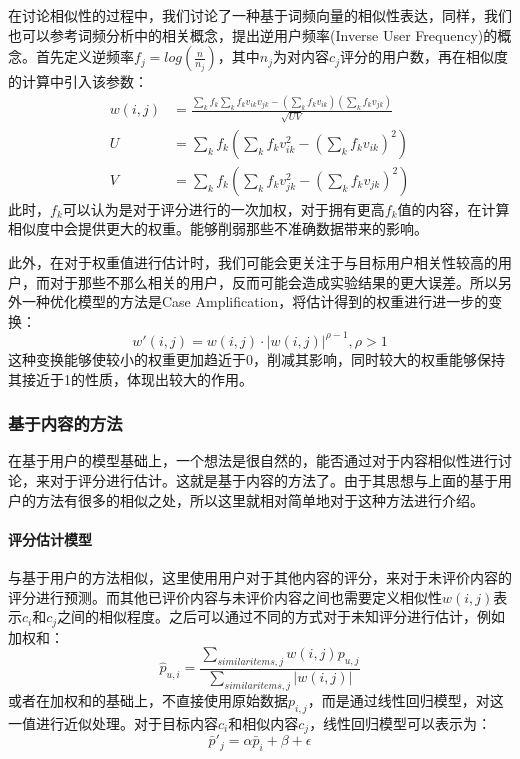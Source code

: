 在讨论相似性的过程中，我们讨论了一种基于词频向量的相似性表达，同样，我们也可以参考词频分析中的相关概念，提出逆用户频率(Inverse User Frequency)的概念\cite{FreqVector}。首先定义逆频率$f_j = log(\frac{n}{n_j})$，其中$n_j$为对内容$c_j$评分的用户数，再在相似度的计算中引入该参数：
\begin{align}
    w(i, j) &= \frac{\sum_{k}f_k\sum_{k}f_k v_{ik}v_{jk} - (\sum_{k}f_k v_{ik})(\sum_{k}f_k v_{jk})}{\sqrt{UV}}\\
    U &= \sum_{k}f_k (\sum_{k}f_k v_{ik}^2 - (\sum_{k}f_k v_{ik})^2)\\
    V &= \sum_{k}f_k (\sum_{k}f_k v_{jk}^2 - (\sum_{k}f_k v_{jk})^2)
\end{align}
此时，$f_k$可以认为是对于评分进行的一次加权，对于拥有更高$f_k$值的内容，在计算相似度中会提供更大的权重。能够削弱那些不准确数据带来的影响。

此外，在对于权重值进行估计时，我们可能会更关注于与目标用户相关性较高的用户，而对于那些不那么相关的用户，反而可能会造成实验结果的更大误差。所以另外一种优化模型的方法是Case Amplification，将估计得到的权重进行进一步的变换\cite{UserCF}：
\begin{equation}
    w'(i,j) = w(i,j) \cdot |w(i, j)|^{\rho - 1},\rho > 1 
\end{equation}
这种变换能够使较小的权重更加趋近于0，削减其影响，同时较大的权重能够保持其接近于1的性质，体现出较大的作用。

\subsubsection{基于内容的方法}
在基于用户的模型基础上，一个想法是很自然的，能否通过对于内容相似性进行讨论，来对于评分进行估计。这就是基于内容的方法了\cite{ItemCF}。由于其思想与上面的基于用户的方法有很多的相似之处，所以这里就相对简单地对于这种方法进行介绍。

\paragraph{评分估计模型}
与基于用户的方法相似，这里使用用户对于其他内容的评分，来对于未评价内容的评分进行预测。而其他已评价内容与未评价内容之间也需要定义相似性$w(i, j)$表示$c_i$和$c_j$之间的相似程度。之后可以通过不同的方式对于未知评分进行估计，例如加权和\cite{ItemCF}：
\begin{equation}
    \hat p_{u, i} = \frac{\sum_{similar items, j}w(i, j)p_{u, j}}{\sum_{similar items, j}|w(i, j)|}
\end{equation}
或者在加权和的基础上，不直接使用原始数据$p_{i, j}$，而是通过线性回归模型，对这一值进行近似处理。对于目标内容$c_i$和相似内容$c_j$，线性回归模型可以表示为\cite{ItemCF}：
\begin{equation}
    \bar p'_j = \alpha \bar p_i + \beta + \epsilon
\end{equation}


